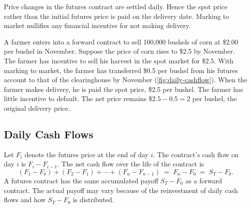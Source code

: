 
Price changes in the futures contract are settled daily.
Hence the spot price rather than the initial futures price is paid on the delivery date.
Marking to market nullifies any financial incentive for not making delivery.

\begin{eg}
	A farmer enters into a forward contract to sell 100,000 bushels of corn at \$2.00 per bushel in November.
	Suppose the price of corn rises to \$2.5 by November.
	The farmer has incentive to sell his harvest in the spot market for \$2.5.
	With marking to market, the farmer has transferred \$0.5 per bushel from his futures account to that of the clearinghouse by November (\autoref{fig:daily-cashflow}).
	When the farmer makes delivery, he is paid the spot price, \$2.5 per bushel.
	The farmer has little incentive to default.
	The net price remains $\$2.5-0.5=2$ per bushel, the original delivery price.
\end{eg}

\suppstart
{}
\suppend

\subsection{Daily Cash Flows}


Let $F_{i}$ denote the futures price at the end of day $i$.
The contract's cash flow on day $i$ is $F_{i}-F_{i-1}$.
The net cash flow over the life of the contract is
\begin{equation}
	(F_{1}-F_{0})+(F_{2}-F_{1})+\cdots+(F_{n}-F_{n-1}) \;=\; F_{n}-F_{0} \;=\; S_{T}-F_{0} .
	\label{eq:futures-cashflow}
\end{equation}
A futures contract has the same accumulated payoff $S_{T}-F_{0}$ as a forward contract.
The actual payoff may vary because of the reinvestment of daily cash flows and how $S_{T}-F_{0}$ is distributed.

